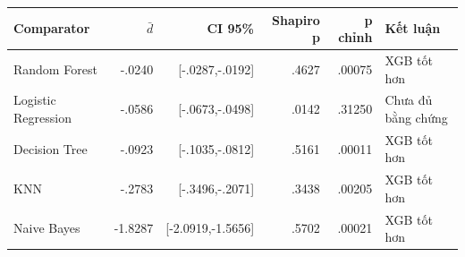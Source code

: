 \begin{tabular}{lrrrrl}
\toprule
Comparator & $\bar d$ & CI 95\% & Shapiro p & p chỉnh & Kết luận \\
\midrule
Random Forest & -.0240 & [-.0287,-.0192] & .4627 & .00075 & XGB tốt hơn \\
Logistic Regression & -.0586 & [-.0673,-.0498] & .0142 & .31250 & Chưa đủ bằng chứng \\
Decision Tree & -.0923 & [-.1035,-.0812] & .5161 & .00011 & XGB tốt hơn \\
KNN & -.2783 & [-.3496,-.2071] & .3438 & .00205 & XGB tốt hơn \\
Naive Bayes & -1.8287 & [-2.0919,-1.5656] & .5702 & .00021 & XGB tốt hơn \\
\bottomrule
\end{tabular}
